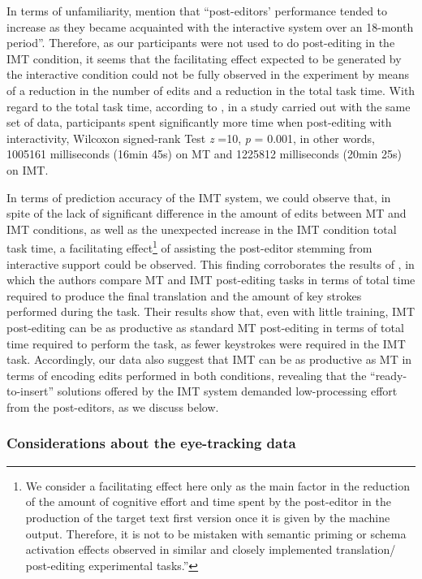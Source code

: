 \documentclass[output=paper]{langsci/langscibook}
\begin{document}
In terms of unfamiliarity, \citet[p. 553]{Underwood2014} mention that “post-editors’ performance tended to increase as they became acquainted with the interactive system over an 18-month period”.  Therefore, as our participants were not used to do post-editing in the IMT condition, it seems that the facilitating effect expected to be generated by the interactive condition could not be fully observed in the experiment by means of a reduction in the number of edits and a reduction in the total task time. With regard to the total task time, according to \citet{alves2015}, in a study carried out with the same set of data, participants spent significantly more time when post-editing with interactivity, Wilcoxon signed-rank Test\textit{ z} =10, \textit{p} = 0.001, in other words, 1005161 milliseconds (16min 45s) on MT and 1225812 milliseconds (20min 25s) on IMT. 



In terms of prediction accuracy of the IMT system, we could observe that, in spite of the lack of significant difference in the amount of edits between MT and IMT conditions, as well as the unexpected increase in the IMT condition total task time, a facilitating effect\footnote{ We consider a facilitating effect here only as the main factor in the reduction of the amount of cognitive effort and time spent by the post-editor in the production of the target text first version once it is given by the machine output. Therefore, it is not to be mistaken with semantic priming or schema activation effects observed in similar and closely implemented translation/ post-editing experimental tasks.”} of assisting the post-editor stemming from interactive support could be observed. This finding corroborates the results of \citet{sanchis2014interactive}, in which the authors compare MT and IMT post-editing tasks in terms of total time required to produce the final translation and the amount of key strokes performed during the task. Their results show that, even with little training, IMT post-editing can be as productive as standard MT post-editing in terms of total time required to perform the task, as fewer keystrokes were required in the IMT task. Accordingly, our data also suggest that IMT can be as productive as MT in terms of encoding edits performed in both conditions, revealing that the “ready-to-insert” solutions offered by the IMT system demanded low-processing effort from the post-editors, as we discuss below.


\subsubsection{Considerations about the eye-tracking data}
\end{document}

